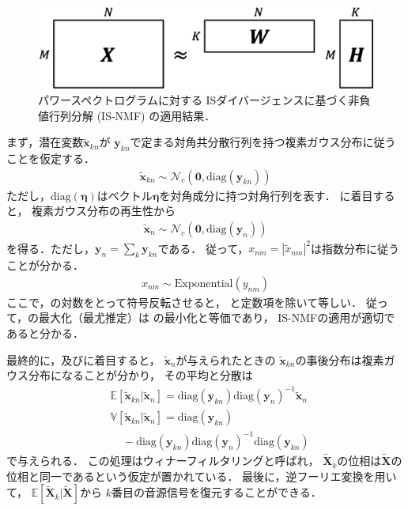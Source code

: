\begin{figure}[t]
\centering
\includegraphics[width=.99\linewidth]{sections/music/nmf}
\caption{パワースペクトログラムに対する
ISダイバージェンスに基づく非負値行列分解 (IS-NMF) の適用結果．}
\label{fig:nmf}
\end{figure}

まず，潜在変数$\tilde{\bm{x}}_{kn}$が
$\bm{y}_{kn}$で定まる対角共分散行列を持つ複素ガウス分布に従うことを仮定する．
\begin{align}
 \tilde{\bm{x}}_{kn} \sim \mathcal{N}_c(\bm{0}, \mbox{diag}(\bm{y}_{kn}))
 \label{eqn:is_s_k_p}
\end{align}
ただし，$\mbox{diag}(\bm\eta)$はベクトル$\bm\eta$を対角成分に持つ対角行列を表す．
に着目すると，
複素ガウス分布の再生性から
\begin{align}
 \tilde{\bm{x}}_n \sim \mathcal{N}_c(\bm{0}, \mbox{diag}(\bm{y}_n))
  \label{eqn:is_s_p}
\end{align}
を得る．ただし，$\bm{y}_n = \sum_k \bm{y}_{kn}$である．
従って，$x_{nm}=|\tilde{x}_{nm}|^2$は指数分布に従うことが分かる．
\begin{align}
 x_{nm} \sim \mbox{Exponential}(y_{nm})
 \label{eqn:is_p}
\end{align}
ここで，の対数をとって符号反転させると，
と定数項を除いて等しい．
従って，の最大化（最尤推定）は
の最小化と等価であり，
IS-NMFの適用が適切であると分かる．

最終的に，及びに着目すると，
$\tilde{\bm{x}}_n$が与えられたときの
$\tilde{\bm{x}}_{kn}$の事後分布は複素ガウス分布になることが分かり，
その平均と分散は
\begin{align}
 &
 \mathbb{E}[\tilde{\bm{x}}_{kn}|\tilde{\bm{x}}_{n}] 
 = \mbox{diag}(\bm{y}_{kn}) \mbox{diag}(\bm{y}_n)^{-1} \tilde{\bm{x}}_{n}
 \label{eqn:s_exp}
 \\
 &
 \mathbb{V}[\tilde{\bm{x}}_{kn}|\tilde{\bm{x}}_{n}] 
 = \mbox{diag}(\bm{y}_{kn}) 
 \nonumber\\
 & \ \ \ \ \
 - \mbox{diag}(\bm{y}_{kn}) \mbox{diag}(\bm{y}_n)^{-1} \mbox{diag}(\bm{y}_{kn})
 \label{eqn:s_var}
\end{align}
で与えられる．
この処理はウィナーフィルタリングと呼ばれ，
$\tilde{\bm{X}}_k$の位相は$\tilde{\bm{X}}$の位相と同一であるという仮定が置かれている．
最後に，逆フーリエ変換を用いて，
$\mathbb{E}[\tilde{\bm{X}}_k|\tilde{\bm{X}}]$から
$k$番目の音源信号を復元することができる．

